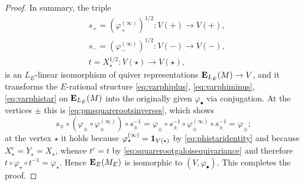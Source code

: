 \documentclass[a4paper,12pt,reqno]{amsart}
\newcommand{\EE}{{\rm\bf E}}
\theoremstyle{plain}
\theoremstyle{remark}
\begin{document}
\begin{proof}
    In summary, the triple
    \begin{align*}
      &s_+=(\varphi_{+}^{(\infty)})^{1/2}\colon V(+)\to V(+),\\
      &s_-=(\varphi_{-}^{(\infty)})^{1/2}\colon V(-)\to V(-),\\
      &t=X_\star^{1/2}\colon V(\star)\to V(\star),
    \end{align*}
    is an $L_E$-linear isomorphism of quiver representations $\EE_{L_E}(M)\to V$, and it transforms the $E$-rational structure \eqref{eq:varphiplus}, \eqref{eq:varphiminus}, \eqref{eq:varphistar} on $\EE_{L_E}(M)$ into the originally given $\varphi_\bullet$ via conjugation. At the vertices $\pm$ this is \eqref{eq:pmsquarerootsinverses}, which shows
    \[
    s_\mp\circ\left(\varphi_\pm\circ\varphi_\pm^{(\infty)}\right)\circ s_\pm^{-1}
    =
    \varphi_\pm\circ
    s_\pm^{-1}\circ
    \varphi_\pm^{(\infty)}\circ s_\pm^{-1}
    =
    \varphi_{\pm};
    \]
    at the vertex $\star$ it holds because $\varphi_\star^{(\infty)}={\bf1}_{V(\star)}$ by \eqref{eq:phistaridentity} and because $X_\star^c=Y_\star=X_\star$, whence $t^c=t$ by \eqref{eq:squarerootgaloisequivariance} and therefore $t\circ\varphi_\star\circ t^{-1}=\varphi_\star$. Hence $\EE_E(M_E)$ is isomorphic to $(V,\varphi_\bullet)$. This completes the proof.
    \end{proof}
\end{document}
